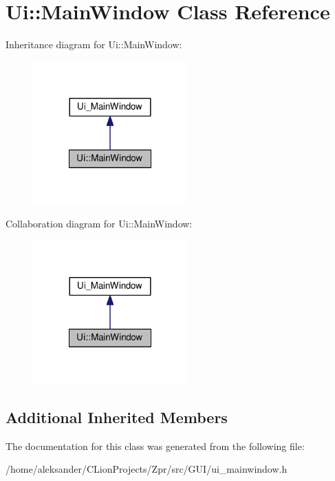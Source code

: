 \hypertarget{classUi_1_1MainWindow}{\section{Ui\-:\-:Main\-Window Class Reference}
\label{classUi_1_1MainWindow}
}


Inheritance diagram for Ui\-:\-:Main\-Window\-:
\nopagebreak
\begin{figure}[H]
\begin{center}
\leavevmode
\includegraphics[width=168pt]{classUi_1_1MainWindow__inherit__graph}
\end{center}
\end{figure}


Collaboration diagram for Ui\-:\-:Main\-Window\-:
\nopagebreak
\begin{figure}[H]
\begin{center}
\leavevmode
\includegraphics[width=168pt]{classUi_1_1MainWindow__coll__graph}
\end{center}
\end{figure}
\subsection*{Additional Inherited Members}


The documentation for this class was generated from the following file\-:\begin{DoxyCompactItemize}
\item 
/home/aleksander/\-C\-Lion\-Projects/\-Zpr/src/\-G\-U\-I/ui\-\_\-mainwindow.\-h\end{DoxyCompactItemize}
